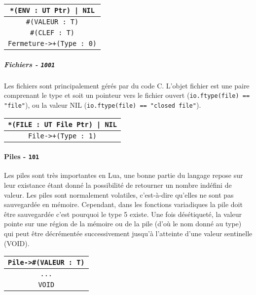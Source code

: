\documentclass{article}
\begin{document}
\begin{center}
\begin{tabular}{|c|}
    \hline
    \texttt{*(ENV : UT Ptr) | NIL}\\
    \hline
    \texttt{\#{}(VALEUR : T)}\\
    \hline
    \texttt{\#{}(CLEF : T)}\\
    \hline
    \texttt{Fermeture->+(Type : 0)}\\
    \hline
\end{tabular}
\end{center}

\subparagraph{Fichiers - \texttt{1001}}
Les fichiers sont principalement gérés par du code C. L'objet fichier est une paire comprenant le type et soit un pointeur vers le fichier ouvert ({\lstset{style=lua}\lstinline$io.ftype(file) == "file"$}), ou la valeur NIL ({\lstset{style=lua}\lstinline$io.ftype(file) == "closed file"$}).
\begin{center}
\begin{tabular}{|c|}
    \hline
    \texttt{*(FILE : UT File Ptr) | NIL}\\
    \hline
    \texttt{File->+(Type : 1)}\\
    \hline
\end{tabular}
\end{center}

\paragraph{Piles - \texttt{101}}
Les piles sont très importantes en Lua, une bonne partie du langage repose sur leur existance étant donné la possibilité de retourner un nombre indéfini de valeur. Les piles sont normalement volatiles, c'est-à-dire qu'elles ne sont pas sauvegardée en mémoire. Cependant, dans les fonctions variadiques la pile doit être sauvegardée c'est pourquoi le type 5 existe. Une fois désétiqueté, la valeur pointe sur une région de la mémoire ou de la pile (d'où le nom donné au type) qui peut être décrémentée successivement jusqu'à l'atteinte d'une valeur sentinelle (VOID).

\begin{center}
\begin{tabular}{|c|}
    \hline
    \texttt{Pile->\#{}(VALEUR : T)}\\
    \hline
    \texttt{...}\\
    \hline
    \texttt{VOID}\\
    \hline
\end{tabular}
\end{center}
\end{document}
